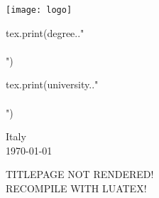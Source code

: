 \begin{titlepage}
\begin{center}
\vspace{1em}

\texttt{[image: logo]}

\vspace{1em}

\begin{luacode}
		tex.print(degree.."\\\\")
\end{luacode}
\begin{luacode}
		tex.print(university.."\\\\")
\end{luacode}
Italy \\
\today

\end{center}
\end{titlepage}
\else
\begin{titlepage}
\begin{center}
\large{TITLEPAGE NOT RENDERED!\\RECOMPILE WITH LUATEX!}
\end{center}
\end{titlepage}
\fi
\hypersetup{pageanchor=true}